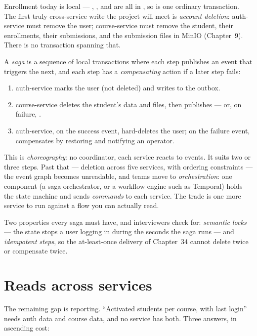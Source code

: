 Enrollment today is local --- , , and
 are all in , so
 is one ordinary transaction. The first
truly cross-service write the project will meet is \emph{account
deletion}: auth-service must remove the user; course-service must remove
the student, their enrollments, their submissions, and the submission
files in MinIO (Chapter~9). There is no transaction spanning that.

A \emph{saga} is a sequence of local transactions where each step
publishes an event that triggers the next, and each step has a
\emph{compensating} action if a later step fails:

\begin{enumerate}
  \item auth-service marks the user  (not deleted) and
  writes  to the outbox.
  \item course-service deletes the student's data and files, then
  publishes  --- or, on failure,
  .
  \item auth-service, on the success event, hard-deletes the user; on
  the failure event, compensates by restoring  and
  notifying an operator.
\end{enumerate}

This is \emph{choreography}: no coordinator, each service reacts to
events. It suits two or three steps. Past that --- deletion across
five services, with ordering constraints --- the event graph becomes
unreadable, and teams move to \emph{orchestration}: one component
(a saga orchestrator, or a workflow engine such as Temporal) holds the
state machine and sends \emph{commands} to each service. The trade is
one more service to run against a flow you can actually read.

Two properties every saga must have, and interviewers check for:
\emph{semantic locks} --- the  state stops a user logging
in during the seconds the saga runs --- and \emph{idempotent steps}, so
the at-least-once delivery of Chapter~34 cannot delete twice or
compensate twice.

\section{Reads across services}

The remaining gap is reporting. ``Activated students per course, with
last login'' needs auth data and course data, and no service has both.
Three answers, in ascending cost:

